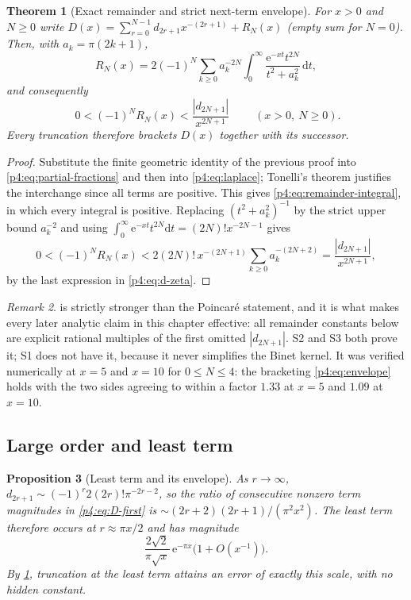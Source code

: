 \documentclass[11pt,a4paper,oneside]{book}
\theoremstyle{plain}
\newtheorem{theorem}{Theorem}[chapter]
\newtheorem{proposition}[theorem]{Proposition}
\theoremstyle{definition}
\theoremstyle{remark}
\newtheorem{remark}[theorem]{Remark}
\newcommand{\e}{\mathrm{e}}
\newcommand{\dd}{\mathrm{d}}
\begin{document}
\begin{theorem}[Exact remainder and strict next-term envelope]
\label{p4:thm:envelope}
For $x>0$ and $N\ge0$ write
$D(x)=\sum_{r=0}^{N-1}d_{2r+1}x^{-(2r+1)}+R_N(x)$ (empty sum for $N=0$).
Then, with $a_k=\pi(2k+1)$,
\begin{equation}
  R_N(x)=2(-1)^{N}\sum_{k\ge0}a_k^{-2N}
  \int_0^\infty\frac{\e^{-xt}t^{2N}}{t^{2}+a_k^{2}}\,\dd t,
  \label{p4:eq:remainder-integral}
\end{equation}
and consequently
\begin{equation}
  \boxed{\;
  0<(-1)^{N}R_N(x)<\frac{|d_{2N+1}|}{x^{2N+1}}\;}
  \qquad(x>0,\ N\ge0).
  \label{p4:eq:envelope}
\end{equation}
Every truncation therefore brackets $D(x)$ together with its successor.
\end{theorem}

\begin{proof}
Substitute the finite geometric identity of the previous proof into
\cref{p4:eq:partial-fractions} and then into \cref{p4:eq:laplace}; Tonelli's
theorem justifies the interchange since all terms are positive.  This gives
\cref{p4:eq:remainder-integral}, in which every integral is positive.
Replacing $(t^{2}+a_k^{2})^{-1}$ by the strict upper bound $a_k^{-2}$ and
using $\int_0^\infty\e^{-xt}t^{2N}\dd t=(2N)!x^{-2N-1}$ gives
\[
  0<(-1)^{N}R_N(x)<2(2N)!\,x^{-(2N+1)}\sum_{k\ge0}a_k^{-(2N+2)}
  =\frac{|d_{2N+1}|}{x^{2N+1}},
\]
by the last expression in \cref{p4:eq:d-zeta}.
\end{proof}

\begin{remark}
 is strictly stronger than the Poincar\'e statement, and
it is what makes every later analytic claim in this chapter effective: all
remainder constants below are explicit rational multiples of the first omitted
$|d_{2N+1}|$.  \textsf{S2} and \textsf{S3} both prove it; \textsf{S1} does not
have it, because it never simplifies the Binet kernel.  It was verified
numerically at $x=5$ and $x=10$ for $0\le N\le4$: the bracketing
\cref{p4:eq:envelope} holds with the two sides agreeing to within a factor
$1.33$ at $x=5$ and $1.09$ at $x=10$.
\end{remark}

\subsection{Large order and least term}

\begin{proposition}[Least term and its envelope]
\label{p4:prop:leastterm}
As $r\to\infty$, $d_{2r+1}\sim(-1)^{r}2(2r)!\pi^{-2r-2}$, so the ratio of
consecutive nonzero term magnitudes in \cref{p4:eq:D-first} is
$\sim(2r+2)(2r+1)/(\pi^{2}x^{2})$.  The least term therefore occurs at
$r\approx\pi x/2$ and has magnitude
\begin{equation}
  \frac{2\sqrt2}{\pi\sqrt x}\,\e^{-\pi x}\bigl(1+O(x^{-1})\bigr).
  \label{p4:eq:least-term}
\end{equation}
By \cref{p4:thm:envelope}, truncation at the least term attains an error of
exactly this scale, with no hidden constant.
\end{proposition}
\end{document}
